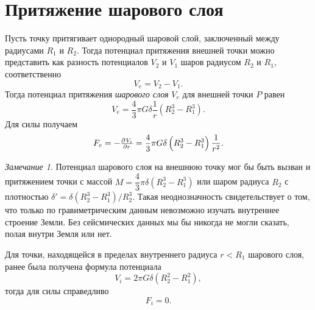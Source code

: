 \documentclass[11pt, a4paper]{article}
\theoremstyle{plain}
\theoremstyle{definition}
\theoremstyle{remark}
\newtheorem{remark}{Замечание}
\begin{document}
\section{Притяжение шарового слоя}
Пусть точку притягивает однородный шаровой слой, заключенный между радиусами $R_1$ и  $R_2$. Тогда
потенциал притяжения внешней точки можно представить как разность потенциалов $V_2$ и $V_1$ шаров радиусом $R_2$ и $R_1$, соответственно
\begin{equation*}
    V_e = V_{2} - V_{1}.
\end{equation*}
Тогда потенциал притяжения \textit{шарового слоя} $V_e$ для внешней точки $P$ равен
\begin{equation*}
    V_e = \dfrac{4}{3}\pi G\delta \dfrac{1}{r} \left( R_2^3 - R_1^3 \right).
\end{equation*}
Для силы получаем
\begin{equation*}
    F_e = -\pd{V_i}{r} = \dfrac{4}{3} \pi G\delta\left( R_2^3 - R_1^3 \right)\dfrac{1}{r^2}.
\end{equation*}
\begin{remark}
    Потенциал шарового слоя на внешнюю точку мог бы быть вызван и притяжением точки с массой
    $M = \dfrac{4}{3}\pi \delta\left( R_2^3 - R_1^3 \right)$ или шаром радиуса $R_2$ с плотностью 
    $\delta' = \delta\left( R_2^3 - R_1^3 \right) / R_2^3$. Такая неоднозначность свидетельствует о
    том, что только по гравиметрическим данным невозможно изучать внутреннее строение Земли.
    Без сейсмических данных мы бы никогда не могли сказать, полая внутри Земля или нет.
\end{remark}

Для точки, находящейся в пределах внутреннего радиуса $r<R_1$ шарового слоя, ранее была получена формула потенциала
\begin{equation*}
    V_i = 2\pi G\delta \left( R_2^2 - R_1^2 \right),
\end{equation*}
тогда для силы справедливо
\begin{equation*}
    F_i = 0.
\end{equation*}
\end{document}
